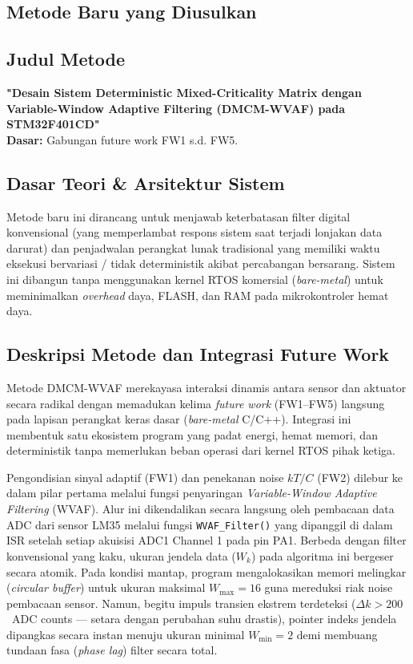 \documentclass[11pt,a4paper]{article}
\begin{document}
\begin{longtable}
\section{Metode Baru yang Diusulkan}
\subsection{Judul Metode}
\textbf{"Desain Sistem Deterministic Mixed-Criticality Matrix dengan Variable-Window Adaptive Filtering (DMCM-WVAF) pada STM32F401CD"} \\
\textbf{Dasar:} Gabungan future work FW1 s.d. FW5.

\subsection{Dasar Teori \& Arsitektur Sistem}
\hspace{1.5em}Metode baru ini dirancang untuk menjawab keterbatasan filter digital konvensional (yang memperlambat respons sistem saat terjadi lonjakan data darurat) dan penjadwalan perangkat lunak tradisional yang memiliki waktu eksekusi bervariasi / tidak deterministik akibat percabangan bersarang. Sistem ini dibangun tanpa menggunakan kernel RTOS komersial (\textit{bare-metal}) untuk meminimalkan \textit{overhead} daya, FLASH, dan RAM pada mikrokontroler hemat daya.

\subsection{Deskripsi Metode dan Integrasi Future Work}
\hspace{1.5em}Metode DMCM-WVAF merekayasa interaksi dinamis antara sensor dan aktuator secara radikal dengan memadukan kelima \textit{future work} (FW1--FW5) langsung pada lapisan perangkat keras dasar (\textit{bare-metal} C/C++). Integrasi ini membentuk satu ekosistem program yang padat energi, hemat memori, dan deterministik tanpa memerlukan beban operasi dari kernel RTOS pihak ketiga.

Pengondisian sinyal adaptif (FW1) dan penekanan noise $kT/C$ (FW2) dilebur ke dalam pilar pertama melalui fungsi penyaringan \textit{Variable-Window Adaptive Filtering} (WVAF). Alur ini dikendalikan secara langsung oleh pembacaan data ADC dari sensor LM35 melalui fungsi \texttt{WVAF\_Filter()} yang dipanggil di dalam ISR setelah setiap akuisisi ADC1 Channel 1 pada pin PA1. Berbeda dengan filter konvensional yang kaku, ukuran jendela data ($W_k$) pada algoritma ini bergeser secara atomik. Pada kondisi mantap, program mengalokasikan memori melingkar (\textit{circular buffer}) untuk ukuran maksimal $W_{\max}=16$ guna mereduksi riak noise pembacaan sensor. Namun, begitu impuls transien ekstrem terdeteksi ($\Delta k > 200$~ADC counts — setara dengan perubahan suhu drastis), pointer indeks jendela dipangkas secara instan menuju ukuran minimal $W_{\min}=2$ demi membuang tundaan fasa (\textit{phase lag}) filter secara total.


\end{longtable}
\end{document}
